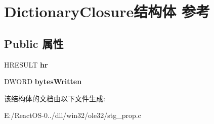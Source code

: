 \hypertarget{struct_dictionary_closure}{}\section{Dictionary\+Closure结构体 参考}
\label{struct_dictionary_closure}
\subsection*{Public 属性}
\begin{DoxyCompactItemize}
\item 
\mbox{\label{struct_dictionary_closure_ae0376223228925241caaded7462b6619}} 
H\+R\+E\+S\+U\+LT {\bfseries hr}
\item 
\mbox{\label{struct_dictionary_closure_a446d5b82430126e5ea15ffb2ae4d7e29}} 
D\+W\+O\+RD {\bfseries bytes\+Written}
\end{DoxyCompactItemize}


该结构体的文档由以下文件生成\+:\begin{DoxyCompactItemize}
\item 
E\+:/\+React\+O\+S-\/0../dll/win32/ole32/stg\+\_\+prop.\+c\end{DoxyCompactItemize}
